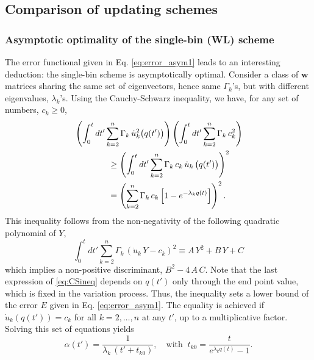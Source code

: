 \documentclass[reprint, floatfix]{revtex4-1}
\newcommand{\Err}{E}
\begin{document}
\subsection{\label{sec:cmpschemes}
Comparison of updating schemes}



\subsubsection{\label{sec:optWL}
Asymptotic optimality of the single-bin (WL) scheme}



The error functional given in Eq. \eqref{eq:error_asym1}
leads to an interesting deduction:
the single-bin scheme is asymptotically optimal.
%
Consider a class of $\mathbf w$ matrices
sharing the same set of eigenvectors,
hence same $\Gamma_k$'s,
but with different eigenvalues, $\lambda_k$'s.
%
Using the Cauchy-Schwarz inequality, we have,
for any set of numbers, $c_k \ge 0$,
%
\begin{align}
&
\left(
  \int_0^t dt'
    \sum_{k = 2}^n
      \Gamma_k \, \dot u_k^2\bigl( q(t') \bigr)
\right)
%
\left(
  \int_0^t dt'
    \sum_{k = 2}^n
      \Gamma_k \, c_k^2
\right)
%
\notag
\\
&
\qquad \qquad
\ge
\left(
  \int_0^t dt'
    \sum_{k = 2}^n
      \Gamma_k \, c_k \, \dot u_k \, \bigl( q(t') \bigr)
\right)^2
\notag
\\
&
\qquad \qquad
=
\left(
  \sum_{k = 2}^n \Gamma_k \, c_k
    \left[
      1 - e^{ -\lambda_k q(t) }
    \right]
\right)^2.
\label{eq:CSineq}
\end{align}
%
This inequality follows from the non-negativity of
the following quadratic polynomial of $Y$,
$$
\int_0^t
  dt' \sum_{k = 2}^n \Gamma_k \,
    \left( \dot u_k \, Y - c_k \right)^2
  \equiv
  A \, Y^2 + B \, Y + C
$$
which implies a non-positive discriminant,
$B^2 - 4 \, A \, C$.
%
Note that the last expression of \eqref{eq:CSineq}
depends on $q(t')$ only through the end point value,
which is fixed in the variation process.
%
Thus, the inequality sets a lower bound
of the error $\Err$
given in Eq. \eqref{eq:error_asym1}.
%
The equality is achieved
if $\dot u_k\left( q(t') \right) = c_k$
for all $k = 2, \dots, n$ at any $t'$,
up to a multiplicative factor.
%
Solving this set of equations yields
%
$$
\alpha(t') = \frac{              1              }
                  { \lambda_k \, (t' + t_{k0} ) },
\quad
\mathrm{with\;\;}
t_{k0} = \frac{             t            }
              { e^{ \lambda_k q(t) } - 1 }.
$$
\end{document}
